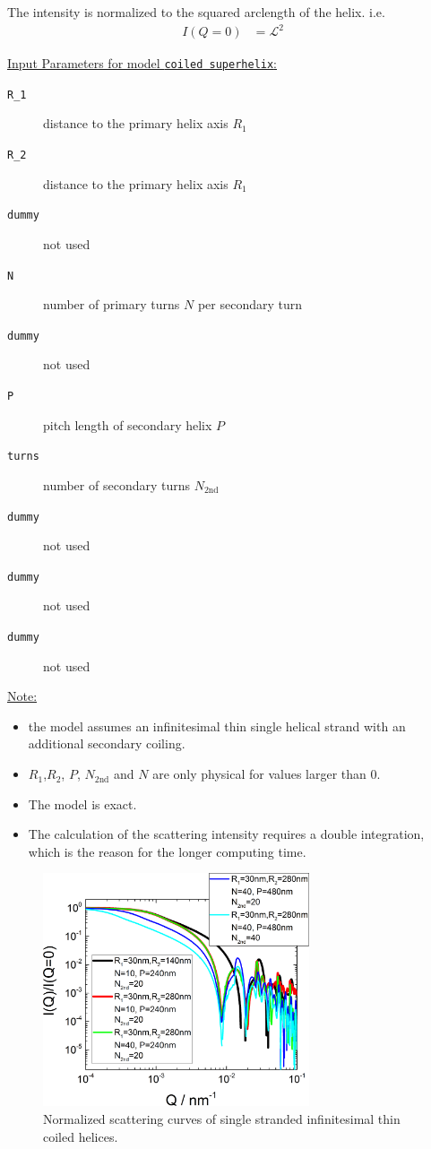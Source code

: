 The intensity is normalized to the squared arclength of the helix. i.e.
\begin{align}
I(Q=0)&=\mathcal{L}^2
\end{align}

\vspace{5mm}

\underline{Input Parameters for model \texttt{coiled superhelix}:}\\
\begin{description}
\item[\texttt{R\_1}] distance to the primary helix axis $R_1$
\item[\texttt{R\_2}] distance to the primary helix axis $R_1$
\item[\texttt{dummy}] not used
\item[\texttt{N}] number of primary turns $N$ per secondary turn
\item[\texttt{dummy}] not used
\item[\texttt{P}] pitch length of secondary helix $P$
\item[\texttt{turns}] number of secondary turns $N_\mathrm{2nd}$
\item[\texttt{dummy}] not used
\item[\texttt{dummy}] not used
\item[\texttt{dummy}] not used
\end{description}

\noindent\underline{Note:}
\begin{itemize}
\item the model assumes an infinitesimal thin single helical strand with an additional secondary coiling.
\item $R_1$,$R_2$, $P$, $N_\mathrm{2nd}$ and $N$ are only physical for values larger than 0.
\item The model is exact.
\item The calculation of the scattering intensity requires a double integration, which is the reason for the longer computing time.
\end{itemize}

\begin{figure}[htb]
\begin{center}
\includegraphics[width=0.7\textwidth]{../images/form_factor/cylindrical_obj/helix_coiledIQ.png}
\end{center}
\caption{Normalized scattering curves of single stranded infinitesimal thin coiled helices.}
\label{fig:helixcoiledIQ}
\end{figure} 